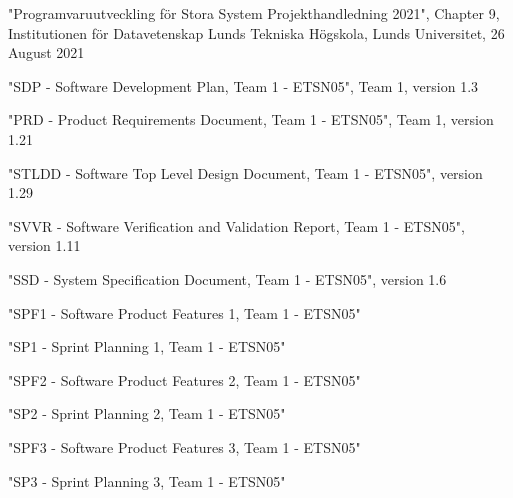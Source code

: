 \documentclass{article}
\begin{document}
\begin{thebibliography}{widest entry}

     "Programvaruutveckling för Stora System Projekthandledning 2021", Chapter 9, Institutionen för Datavetenskap Lunds Tekniska Högskola, Lunds Universitet, 26 August 2021
    
     "SDP - Software Development Plan, Team 1 - ETSN05", Team 1, version 1.3
    
     "PRD - Product Requirements Document, Team 1 - ETSN05", Team 1, version 1.21
    
     "STLDD - Software Top Level Design Document, Team 1 - ETSN05", version 1.29
    
    
     "SVVR - Software Verification and Validation Report, Team 1 - ETSN05", version 1.11
    
     "SSD - System Specification Document, Team 1 - ETSN05", version 1.6
    
     "SPF1 - Software Product Features 1, Team 1 - ETSN05"
    
     "SP1 - Sprint Planning 1, Team 1 - ETSN05"
    
     "SPF2 - Software Product Features 2, Team 1 - ETSN05"
    
     "SP2 - Sprint Planning 2, Team 1 - ETSN05"
    
     "SPF3 - Software Product Features 3, Team 1 - ETSN05"
    
     "SP3 - Sprint Planning 3, Team 1 - ETSN05"
    
\end{thebibliography}
\newpage

\tableofcontents
\newpage

\end{document}
